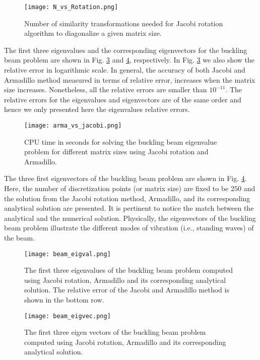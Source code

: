 \documentclass[a4paper]{article}
\begin{document}
\begin{figure}[H]
  \centering
  \texttt{[image: N\_vs\_Rotation.png]}
  \caption{Number of similarity transformations needed for Jacobi rotation algorithm to diagonalize a given matrix size.}
   \label{N_vs_Rotation}
\end{figure}

The first three eigenvalues and the corresponding eigenvectors for the buckling beam problem are shown in Fig. \ref{beam_eigval} and \ref{beam_eigvec}, respectively. In Fig. \ref{beam_eigval} we also show the relative error in logarithmic scale. In general, the accuracy of both Jacobi and Armadillo method measured in terms of relative error, increases when the matrix size increases. Nonetheless, all the relative errors are smaller than $10^{-11}$. The relative errors for the eigenvalues and eigenvectors are of the same order and hence we only presented here the eigenvalues relative errors. 

\begin{figure}[H]
  \centering
  \texttt{[image: arma\_vs\_jacobi.png]}
  \caption{CPU time in seconds for solving the buckling beam eigenvalue problem for different matrix sizes using Jacobi rotation and Armadillo.}
   \label{arma_vs_jacobi}
\end{figure}

The three first eigenvectors of the buckling beam problem are shown in Fig. \ref{beam_eigvec}. Here, the number of discretization points (or matrix size) are fixed to be $250$ and the solution from the Jacobi rotation method, Armadillo, and its corresponding analytical solution are presented. It is pertinent to notice the match between the analytical and the numerical solution. Physically, the eigenvectors of the buckling beam problem illustrate the different modes of vibration (i.e., standing waves) of the beam. 

\begin{figure}[H]
  \centering
  \texttt{[image: beam\_eigval.png]}
  \caption{The first three eigenvalues of the buckling beam problem computed using Jacobi rotation, Armadillo and its corresponding analytical solution. The relative error of the Jacobi and Armadillo method is shown in the bottom row.}
   \label{beam_eigval}
\end{figure}
\begin{figure}[H]
  \centering
  \texttt{[image: beam\_eigvec.png]}
  \caption{The first three eigen vectors of the buckling beam problem computed using Jacobi rotation, Armadillo and its corresponding analytical solution.}
   \label{beam_eigvec}
\end{figure}
\end{document}
